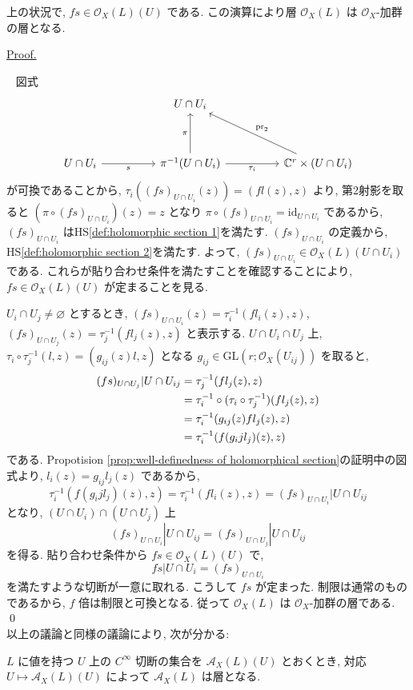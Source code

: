 \documentclass[a4paper,10pt,dvipdfmx]{jsreport}
\newenvironment{prop*}{\refstepcounter{theorem}\begin{itembox}[l]{\underline{Proposition \arabic{chapter}.\arabic{section}.\arabic{theorem}. }}\vspace{-0.5zh}\ }{\end{itembox}}
\renewenvironment{proof}{\begin{flushleft} \underline{Proof.} \end{flushleft}\vspace{-1zh}\ }{\qed\\}
\newcounter{theorem}[section]
\renewcommand{\emptyset}{\varnothing}
\newcommand{\id}{\textrm{id}}
\theoremstyle{definition}
\begin{document}
\begin{prop*}
    上の状況で, \(fs \in \mathcal{O}_X(L)(U)\) である. この演算により層 \(\mathcal{O}_X(L)\) は \(\mathcal{O}_X\)-加群の層となる.
\end{prop*}
\begin{proof}
    図式
    \[\begin{tikzcd}
        && {U\cap U_i} \\
        \\
        {U\cap U_i} && {\pi^{-1}(U\cap U_i)} && {\mathbb{C}^r\times(U\cap U_i)}
        \arrow["s"', from=3-1, to=3-3]
        \arrow["\pi", from=3-3, to=1-3]
        \arrow["{\tau_i}"', from=3-3, to=3-5]
        \arrow["{\textrm{pr}_2}"', from=3-5, to=1-3]
    \end{tikzcd}\]
    が可換であることから, \(\tau_i((fs)_{U\cap U_i}(z)) = (fl(z),z)\) より, 第2射影を取ると \((\pi \circ (fs)_{U\cap U_i})(z) = z\) となり \(\pi \circ (fs)_{U\cap U_i} = \id_{U\cap U_i}\) であるから, \((fs)_{U\cap U_i}\) はHS\ref{def:holomorphic section 1}を満たす. \((fs)_{U\cap U_i}\) の定義から, HS\ref{def:holomorphic section 2}を満たす. よって, \((fs)_{U\cap U_i} \in \mathcal{O}_X(L)(U\cap U_i)\) である. これらが貼り合わせ条件を満たすことを確認することにより, \(fs \in \mathcal{O}_X(L)(U)\) が定まることを見る.

    \(U_i \cap U_j \neq \emptyset\) とするとき, \((fs)_{U\cap U_i}(z) = \tau^{-1}_i (fl_i(z),z)\), \((fs)_{U\cap U_j}(z) = \tau^{-1}_j (fl_j(z),z)\) と表示する. \(U\cap U_i \cap U_j\) 上, \(\tau_i \circ \tau_j ^{-1}(l,z) = (g_{ij}(z)l,z)\) となる \(g_{ij} \in \textrm{GL}(r;\mathcal{O}_X (U_{ij}))\) を取ると,
    \begin{align}
        (fs)_{U\cap U_j}|U\cap U_{ij}
        &= \tau_j^{-1}(fl_j(z),z)\notag\\
        &= \tau_i^{-1} \circ (\tau_i \circ \tau_j^{-1})(fl_j(z),z)\notag\\
        &= \tau_i^{-1}(g_{ij}(z)fl_j(z),z)\notag\\
        &= \tau_i^{-1}(f(g_ij l_j)(z),z)
    \end{align}
    である. Propotision \ref{prop:well-definedness of holomorphical section}の証明中の図式より, \(l_i(z) = g_{ij}l_j(z)\) であるから,
    \[
        \tau_i^{-1}(f(g_ij l_j)(z),z) = \tau_i^{-1}(fl_i(z),z) = (fs)_{U\cap U_i}|U\cap U_{ij}
    \]
    となり, \((U\cap U_i) \cap (U\cap U_j)\) 上
    \[
        (fs)_{U\cap U_i}|U\cap U_{ij} = (fs)_{U\cap U_j}|U\cap U_{ij}
    \]
    を得る. 貼り合わせ条件から \(fs \in \mathcal{O}_X(L)(U)\) で,
    \[
        fs|U\cap U_i = (fs)_{U\cap U_i}
    \]
    を満たすような切断が一意に取れる. こうして \(fs\) が定まった. 制限は通常のものであるから, \(f\) 倍は制限と可換となる. 従って \(\mathcal{O}_X(L)\) は \(\mathcal{O}_X\)-加群の層である.
\end{proof}
以上の議論と同様の議論により, 次が分かる:
\begin{prop*}
    \(L\) に値を持つ \(U\) 上の \(C^\infty\) 切断の集合を \(\mathcal{A}_X(L)(U)\) とおくとき, 対応 \(U\mapsto \mathcal{A}_X(L)(U)\) によって \(\mathcal{A}_X(L)\) は層となる.
\end{prop*}
\end{document}
